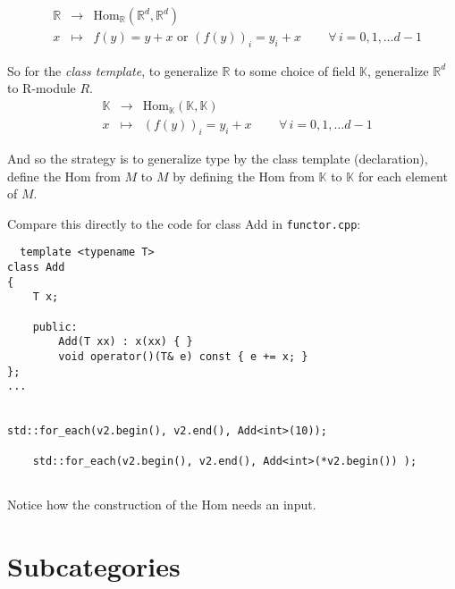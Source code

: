 \documentclass[twoside,landscape,10pt]{amsart}
\theoremstyle{plain}
\theoremstyle{definition}
\theoremstyle{remark}
\begin{document}
\begin{multicols*}{2}
\begin{equation}
\begin{aligned}
  & \mathbb{R} & \to & \text{Hom}_{\mathbb{R}}( \mathbb{R}^d, \mathbb{R}^d ) \\ 
  & x & \mapsto & f(y) = y + x  \text{ or } (f(y))_i = y_i + x \qquad \, \forall \, i = 0, 1, \dots d-1
  \end{aligned}
  \end{equation}

So for the \emph{class template}, to generalize $\mathbb{R}$ to some choice of field $\mathbb{K}$, generalize $\mathbb{R}^d$ to R-module $R$.
\begin{equation}
\begin{aligned}
  & \mathbb{K} & \to & \text{Hom}_{\mathbb{K}}( \mathbb{K}, \mathbb{K} ) \\ 
  & x & \mapsto & (f(y))_i = y_i + x \qquad \, \forall \, i = 0, 1, \dots d-1
  \end{aligned}
  \end{equation}

And so the strategy is to generalize type by the class template (declaration), define the $\text{Hom}$ from $M$ to $M$ by defining the $\text{Hom}$ from $\mathbb{K}$ to $\mathbb{K}$ for each element of $M$.  

Compare this directly to the code for class Add in \verb|functor.cpp|:
\begin{lstlisting}
  template <typename T>
class Add
{
	T x;
	
	public:
		Add(T xx) : x(xx) { } 
		void operator()(T& e) const { e += x; }
};
...


std::for_each(v2.begin(), v2.end(), Add<int>(10));

	std::for_each(v2.begin(), v2.end(), Add<int>(*v2.begin()) );
        
\end{lstlisting}
Notice how the construction of the $\text{Hom}$ needs an input.  



\section{Subcategories}


\end{multicols*}
\end{document}
